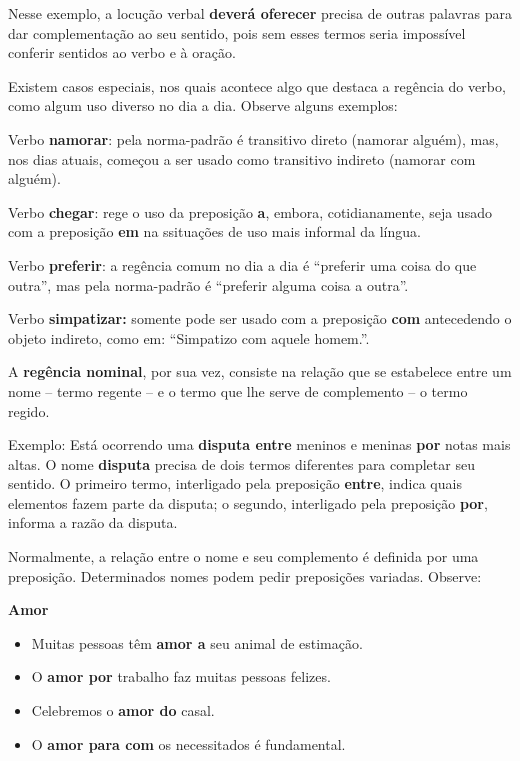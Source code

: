 {Nesse exemplo, a locução verbal \textbf{deverá oferecer} precisa de
outras palavras para dar complementação ao seu sentido, pois sem esses
termos seria impossível conferir sentidos ao verbo e à oração.

Existem casos especiais, nos quais acontece algo que destaca a regência
do verbo, como algum uso diverso no dia a dia. Observe alguns exemplos:

Verbo \textbf{namorar}: pela norma-padrão é transitivo direto (namorar
alguém), mas, nos dias atuais, começou a ser usado como transitivo
indireto (namorar com alguém).

Verbo \textbf{chegar}: rege o uso da preposição \textbf{a}, embora,
cotidianamente, seja usado com a preposição \textbf{em} na ssituações de
uso mais informal da língua.

Verbo \textbf{preferir}: a regência comum no dia a dia é ``preferir uma
coisa do que outra'', mas pela norma-padrão é ``preferir alguma coisa a
outra''.

Verbo \textbf{simpatizar:} somente pode ser usado com a preposição
\textbf{com} antecedendo o objeto indireto, como em: ``Simpatizo com
aquele homem.''.

A \textbf{regência nominal}, por sua vez, consiste na relação que se
estabelece entre um nome -- termo regente -- e o termo que lhe serve de
complemento -- o termo regido.

Exemplo: Está ocorrendo uma \textbf{disputa entre} meninos e meninas
\textbf{por} notas mais altas. O nome \textbf{disputa} precisa de dois
termos diferentes para completar seu sentido. O primeiro termo,
interligado pela preposição \textbf{entre}, indica quais elementos fazem
parte da disputa; o segundo, interligado pela preposição \textbf{por},
informa a razão da disputa.

Normalmente, a relação entre o nome e seu complemento é definida por uma
preposição. Determinados nomes podem pedir preposições variadas.
Observe:

\textbf{Amor}

\begin{itemize}
\item Muitas pessoas têm \textbf{amor a} seu animal de estimação.

\item O \textbf{amor por} trabalho faz muitas pessoas felizes.

\item Celebremos o \textbf{amor do} casal.

\item O \textbf{amor para com} os necessitados é fundamental.
\end{itemize}
}

